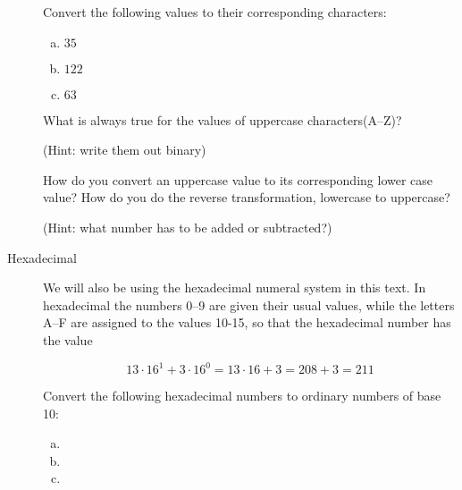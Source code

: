 \begin{description}
  \begin{Exercise}[label={num-to-ascii}]
    Convert the following \ascii values to their corresponding characters:
    \begin{enumerate}[(a)]
    \item $35$
    \item $122$
    \item $63$
    \end{enumerate}
  \end{Exercise}

  \begin{Exercise}[label={ascii-uppercase}]

    What is always true for the \ascii values of uppercase characters(A--Z)?

    (Hint: write them out binary)

  \end{Exercise}

  \begin{Exercise}[label={uppercase-conv}]

    How do you convert an uppercase \ascii value to its corresponding
    lower case value? How do you do the reverse transformation,
    lowercase to uppercase?

    (Hint: what number has to be added or subtracted?)

  \end{Exercise}

\item[Hexadecimal] We will also be using the hexadecimal numeral
  system in this text. In hexadecimal the numbers 0--9 are given their
  usual values, while the letters A--F are assigned to the values
  10-15, so that the hexadecimal number  has the value

  \begin{equation*}
   13 \cdot 16^1 + 3 \cdot 16^0 = 13 \cdot 16 + 3 = 208 + 3 = 211
  \end{equation*}

  \begin{Exercise}[label={hex-to-n}]
    Convert the following hexadecimal numbers to ordinary numbers of
    base 10:

    \begin{enumerate}[(a)]
    \item {}
    \item {}
    \item {}
    \end{enumerate}


\end{Exercise}
\end{description}
